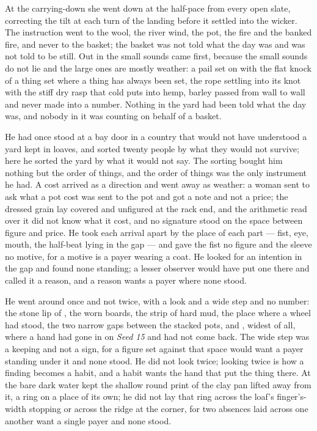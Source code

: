 At the carrying-down she went down  at the half-pace from every open slate, correcting the tilt at each turn of the landing before it settled into the wicker. The instruction went to the wool, the river wind, the pot, the fire and the banked fire, and never to the basket; the basket was not told what the day was and was not told to be still. Out in  the small sounds came first, because the small sounds do not lie and the large ones are mostly weather: a pail set on  with the flat knock of a thing set where a thing has always been set, the rope settling into its knot with the stiff dry rasp that cold puts into hemp, barley passed from wall to wall and never made into a number. Nothing in the yard had been told what the day was, and nobody in it was counting on behalf of a basket.

He had once stood at a bay door in a country that would not have understood a yard kept in loaves, and sorted twenty people by what they would not survive; here he sorted the yard by what it would not say. The sorting bought him nothing but the order of things, and the order of things was the only instrument he had. A cost arrived as a direction and went away as weather: a woman sent to ask what a pot cost was sent to the pot and got a note and not a price; the dressed grain lay covered and unfigured at the rack end, and the arithmetic read over it did not know what it cost, and no signature stood on the space between figure and price. He took each arrival apart by the place of each part --- fist, eye, mouth, the half-beat lying in the gap --- and gave the fist no figure and the sleeve no motive, for a motive is a payer wearing a coat. He looked for an intention in the gap and found none standing; a lesser observer would have put one there and called it a reason, and a reason wants a payer where none stood.

\scenebreak

He went around  once and not twice, with a look and a wide step and no number: the stone lip of , the worn boards, the strip of hard mud, the place where a wheel had stood, the two narrow gaps between the stacked pots, and , widest of all, where a hand had gone in on \emph{Seed 15} and had not come back. The wide step was a keeping and not a sign, for a figure set against that space would want a payer standing under it and none stood. He did not look twice; looking twice is how a finding becomes a habit, and a habit wants the hand that put the thing there. At  the bare dark water kept the shallow round print of the clay pan lifted away from it, a ring on a place of its own; he did not lay that ring across the loaf's finger's-width stopping or across the ridge at the corner, for two absences laid across one another want a single payer and none stood.

